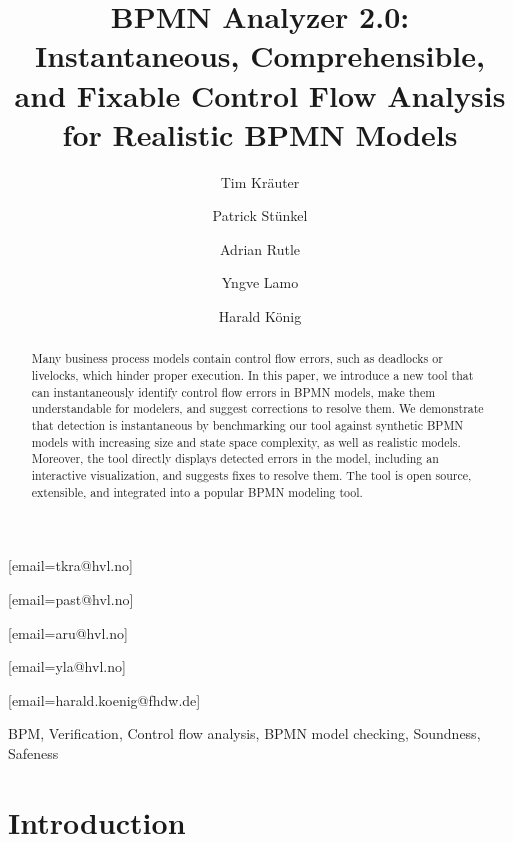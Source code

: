 \documentclass[onecolumn]{ceurart}
\begin{document}


\title{BPMN Analyzer 2.0: Instantaneous, Comprehensible, and Fixable Control Flow Analysis for Realistic BPMN Models}

\author[1]{Tim Kräuter}
[email=tkra@hvl.no]
\author[1]{Patrick Stünkel}
[email=past@hvl.no]
\author[1]{Adrian Rutle}
[email=aru@hvl.no]
\author[1]{Yngve Lamo}
[email=yla@hvl.no]
\author[2,1]{Harald König}
[email=harald.koenig@fhdw.de]
\address[1]{Western Norway University of Applied Sciences, Bergen, Norway}
\address[2]{FHDW Hannover, Germany}

\begin{abstract}
Many business process models contain control flow errors, such as deadlocks or livelocks, which hinder proper execution.
In this paper, we introduce a new tool that can instantaneously identify control flow errors in BPMN models, make them understandable for modelers, and suggest corrections to resolve them.
We demonstrate that detection is instantaneous by benchmarking our tool against synthetic BPMN models with increasing size and state space complexity, as well as realistic models.
Moreover, the tool directly displays detected errors in the model, including an interactive visualization, and suggests fixes to resolve them.
The tool is open source, extensible, and integrated into a popular BPMN modeling tool.
\end{abstract}

\begin{keywords}
BPM,
Verification,
Control flow analysis,
BPMN model checking,
Soundness,
Safeness
\end{keywords}

\maketitle

\section{Introduction}
\end{document}
